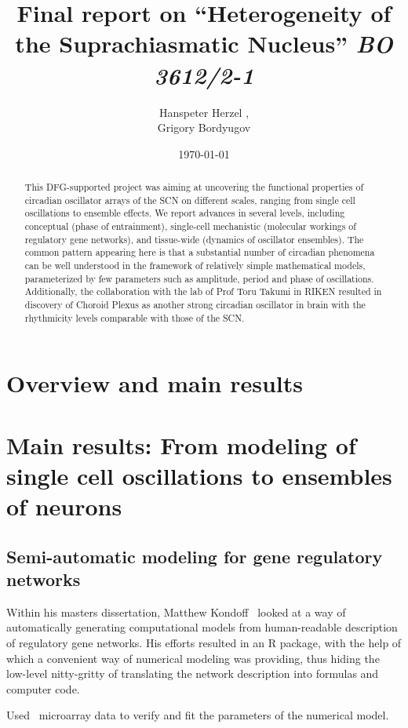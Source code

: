 \documentclass[a4paper]{article}
\title{Final report on ``Heterogeneity of the Suprachiasmatic
Nucleus'' {\em BO 3612/2-1}}
\author{Hanspeter Herzel  \mailhref{h.herzel@biologie.hu-berlin.de},\\
        Grigory Bordyugov \mailhref{grigory.bordyugov@gmail.com}}
\date{\today}
\begin{document}
\maketitle

\begin{abstract}
  This DFG-supported project was aiming at uncovering the functional
  properties of circadian oscillator arrays of the SCN on different
  scales, ranging from single cell oscillations to ensemble effects.
  We report advances in several levels, including conceptual (phase of
  entrainment), single-cell mechanistic (molecular workings of
  regulatory gene networks), and tissue-wide (dynamics of oscillator
  ensembles). The common pattern appearing here is that a substantial
  number of circadian phenomena can be well understood in the
  framework of relatively simple mathematical models, parameterized by
  few parameters such as amplitude, period and phase of oscillations.
  Additionally, the collaboration with the lab of Prof Toru Takumi in
  RIKEN resulted in discovery of Choroid Plexus as another strong
  circadian oscillator in brain with the rhythmicity levels comparable
  with those of the SCN.
\end{abstract}

\tableofcontents

\section{Overview and main results}

\section{Main results: From modeling of single cell oscillations to
ensembles of neurons}

\subsection{Semi-automatic modeling for gene regulatory networks}
Within his masters dissertation, Matthew
Kondoff~\cite{kondoff2015modeling} looked at a way of automatically
generating computational models from human-readable description of
regulatory gene networks. His efforts resulted in an R package, with
the help of which a convenient way of numerical modeling was
providing, thus hiding the low-level nitty-gritty of translating the
network description into formulas and computer code.


Used~\cite{zhang2014circadian} microarray data to verify and fit the
parameters of the numerical model.
\end{document}
